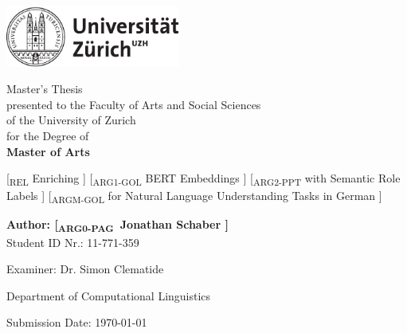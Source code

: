 \begin{titlepage}
\includegraphics[height=20mm]{images/uzh_logo_d_pos}\\

\begin{center}

{\sffamily
Master's Thesis \\
presented to the Faculty of Arts and Social Sciences \\
of the University of Zurich \\
\vspace{1cm}
for the Degree of \\
\textbf{Master of Arts} \\

\vspace{2cm}

{\Large
        {\color{light-gray} [\textsubscript{\footnotesize REL}} Enriching{\color{light-gray} ]}
        {\color{light-gray} [\textsubscript{\footnotesize ARG1-GOL}} BERT Embeddings{\color{light-gray} ]}
        {\color{light-gray} [\textsubscript{\footnotesize ARG2-PPT}} with Semantic Role Labels{\color{light-gray} ]}
        {\color{light-gray} [\textsubscript{\footnotesize ARGM-GOL}} for Natural Language Understanding Tasks in German{\color{light-gray} ]} %
}\\

\vspace{4cm}

\textbf{Author: {\color{light-gray} [\textsubscript{\scriptsize ARG0-PAG}} Jonathan Schaber{\color{light-gray} ]}} \\
	Student ID Nr.: 11-771-359 \\

\vspace{2cm}

Examiner: Dr. Simon Clematide


Department of Computational Linguistics

\vfill Submission Date: \today

\vspace{3cm}
}
\end{center}

\end{titlepage}

\newpage
